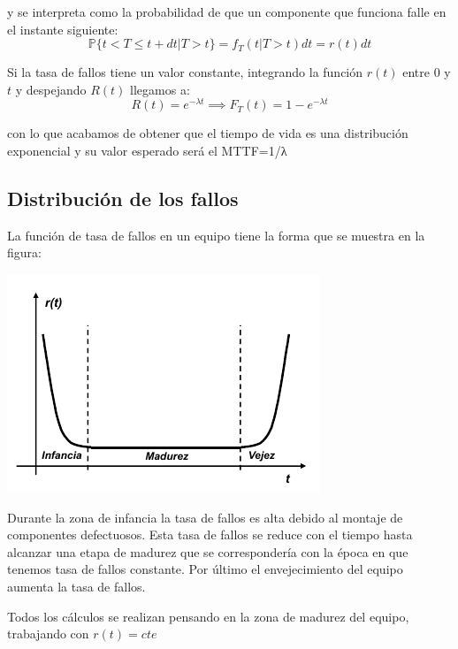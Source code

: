 y se interpreta como la probabilidad de que un componente que funciona falle en el instante siguiente:
\[\mathbb{P}\{t<T\leq t + dt | T > t\}=f_T(t | T > t)dt=r(t)dt\]

Si la tasa de fallos tiene un valor constante, integrando la función $r(t)$ entre $0$ y $t$ y despejando $R(t)$ llegamos a:
\[R(t)=e^{-λt} \implies F_T(t) = 1-e^{-λt}\]

con lo que acabamos de obtener que el tiempo de vida es una distribución exponencial y su valor esperado será el MTTF=1/λ

\subsection{Distribución de los fallos}

La función de tasa de fallos en un equipo tiene la forma que se muestra en la figura:
\begin{center}
\includegraphics[width=0.7\linewidth]{img/tasa_fallos.png}
\end{center}

Durante la zona de infancia la tasa de fallos es alta debido al montaje de componentes defectuosos. Esta tasa de fallos se reduce con el tiempo hasta alcanzar una etapa de madurez que se correspondería con la época en que tenemos tasa de fallos constante. Por último el envejecimiento del equipo aumenta la tasa de fallos.

Todos los cálculos se realizan pensando en la zona de madurez del equipo, trabajando con $r(t)=cte$

